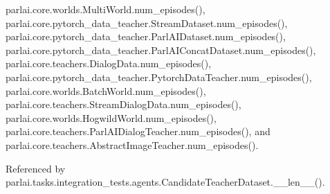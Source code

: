 parlai.\+core.\+worlds.\+Multi\+World.\+num\+\_\+episodes(), parlai.\+core.\+pytorch\+\_\+data\+\_\+teacher.\+Stream\+Dataset.\+num\+\_\+episodes(), parlai.\+core.\+pytorch\+\_\+data\+\_\+teacher.\+Parl\+A\+I\+Dataset.\+num\+\_\+episodes(), parlai.\+core.\+pytorch\+\_\+data\+\_\+teacher.\+Parl\+A\+I\+Concat\+Dataset.\+num\+\_\+episodes(), parlai.\+core.\+teachers.\+Dialog\+Data.\+num\+\_\+episodes(), parlai.\+core.\+pytorch\+\_\+data\+\_\+teacher.\+Pytorch\+Data\+Teacher.\+num\+\_\+episodes(), parlai.\+core.\+worlds.\+Batch\+World.\+num\+\_\+episodes(), parlai.\+core.\+teachers.\+Stream\+Dialog\+Data.\+num\+\_\+episodes(), parlai.\+core.\+worlds.\+Hogwild\+World.\+num\+\_\+episodes(), parlai.\+core.\+teachers.\+Parl\+A\+I\+Dialog\+Teacher.\+num\+\_\+episodes(), and parlai.\+core.\+teachers.\+Abstract\+Image\+Teacher.\+num\+\_\+episodes().



Referenced by parlai.\+tasks.\+integration\+\_\+tests.\+agents.\+Candidate\+Teacher\+Dataset.\+\_\+\+\_\+len\+\_\+\+\_\+().

